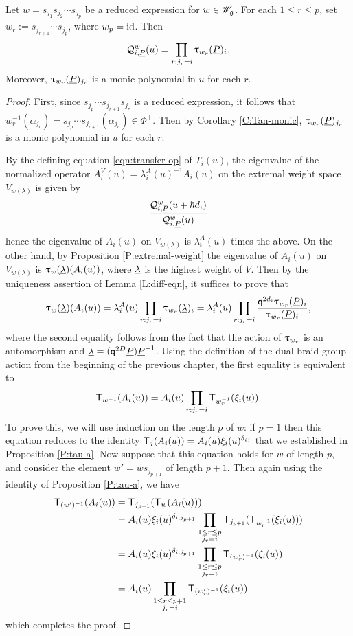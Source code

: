 \begin{theorem}\label{T:baxter}
    Let $w = s_{j_1}s_{j_2}\cdots s_{j_p}$ be a reduced expression for $w\in\mathscr{W}_{\mathfrak{g}}$.
    For each $1\leq r\leq p$, set $w_r := s_{j_{r+1}}\cdots s_{j_p}$, where $w_p = {\operatorname{id}}$.
    Then
    \[\mathcal{Q}_{i,\underline{P}}^w(u) = \prod_{r:j_r=i} \uptau_{w_r}(\underline{P})_i.\]
    Moreover, $\uptau_{w_r}(\underline{P})_{j_r}$ is a monic polynomial in $u$ for each $r$.
\end{theorem}
\begin{proof}
    First, since $s_{j_p}\cdots s_{j_{r+1}}s_{j_r}$ is a reduced expression, it follows that $w_r^{-1}(\alpha_{j_r}) = s_{j_p}\cdots s_{j_{r+1}}(\alpha_{j_r}) \in\Phi^+$.
    Then by Corollary \ref{C:Tan-monic}, $\uptau_{w_r}(\underline{P})_{j_r}$ is a monic polynomial in $u$ for each $r$.

    By the defining equation \ref{eqn:transfer-op} of $T_i(u)$, the eigenvalue of the normalized operator $A_i^V(u) = \lambda_i^A(u)^{-1}A_i(u)$ on the extremal weight space $V_{w(\lambda)}$ is given by
    \[\frac{\mathcal{Q}_{i,\underline{P}}^w(u+\hbar d_i)}{\mathcal{Q}_{i,\underline{P}}^w(u)}\]
    hence the eigenvalue of $A_i(u)$ on $V_{w(\lambda)}$ is $\lambda_i^A(u)$ times the above.
    On the other hand, by Proposition \ref{P:extremal-weight} the eigenvalue of $A_i(u)$ on $V_{w(\lambda)}$ is $\uptau_w(\underline{\lambda})(A_i(u))$, where $\underline{\lambda}$ is the highest weight of $V$.
    Then by the uniqueness assertion of Lemma \ref{L:diff-eqn}, it suffices to prove that
    \[\uptau_w(\underline{\lambda})(A_i(u))
    = \lambda_i^A(u)\prod_{r:j_r=i}\uptau_{w_r}(\underline{\lambda})_i
    = \lambda_i^A(u)\prod_{r:j_r=i}\frac{\mathsf{q}^{2d_i}\uptau_{w_r}(\underline{P})_i}{\uptau_{w_r}(\underline{P})_i},\]
    where the second equality follows from the fact that the action of $\uptau_{w_r}$ is an automorphism and $\underline{\lambda} = (\mathsf{q}^{2D}\underline{P})\underline{P}^{-1}$.
    Using the definition of the dual braid group action from the beginning of the previous chapter, the first equality is equivalent to
    \[\mathsf{T}_{w^{-1}}(A_i(u)) = A_i(u)\prod_{r:j_r=i}\mathsf{T}_{w_r^{-1}}(\xi_i(u)).\]
    To prove this, we will use induction on the length $p$ of $w$: if $p = 1$ then this equation reduces to the identity $\mathsf{T}_j(A_i(u)) = A_i(u)\xi_i(u)^{\delta_{ij}}$ that we established in Proposition \ref{P:tau-a}.
    Now suppose that this equation holds for $w$ of length $p$, and consider the element $w' = ws_{j_{p+1}}$ of length $p+1$.
    Then again using the identity of Proposition \ref{P:tau-a}, we have
    \begin{align*}
        \mathsf{T}_{(w')^{-1}}(A_i(u)) &= \mathsf{T}_{j_{p+1}}(\mathsf{T}_w(A_i(u))) \\
        &= A_i(u)\xi_i(u)^{\delta_{i,j_{p+1}}}\prod_{\substack{1\leq r\leq p \\ j_r=i}}\mathsf{T}_{j_{p+1}}(\mathsf{T}_{w_r^{-1}}(\xi_i(u))) \\
        &= A_i(u)\xi_i(u)^{\delta_{i,j_{p+1}}}\prod_{\substack{1\leq r\leq p \\ j_r=i}}\mathsf{T}_{(w'_r)^{-1}}(\xi_i(u)) \\
        &= A_i(u)\prod_{\substack{1\leq r\leq p+1 \\ j_r=i}}\mathsf{T}_{(w'_r)^{-1}}(\xi_i(u))
    \end{align*}
    which completes the proof.
\end{proof}


